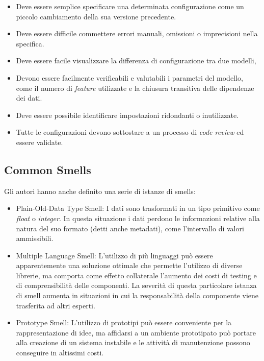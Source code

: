 \begin{itemize}
\item Deve essere semplice specificare una determinata configurazione come un piccolo cambiamento della sua versione precedente.
\item Deve essere difficile commettere errori manuali, omissioni o imprecisioni nella specifica.
\item Deve essere facile visualizzare la differenza di configurazione tra due modelli,
\item Devono essere facilmente verificabili e valutabili i parametri del modello, come il numero di \textit{feature} utilizzate e la chiusura transitiva delle dipendenze dei dati.
\item Deve essere possibile identificare impostazioni ridondanti o inutilizzate.
\item Tutte le configurazioni devono sottostare a un processo di \textit{code review} ed essere validate.
\end{itemize}

\subsection{Common Smells}

Gli autori hanno anche definito una serie di istanze di smells:

\begin{itemize}
    \item Plain-Old-Data Type Smell: I dati sono trasformati in un tipo primitivo come \textit{float} o \textit{integer}. In questa situazione i dati perdono le informazioni relative alla natura del suo formato (detti anche metadati), come l'intervallo di valori ammissibili.
    \item Multiple Language Smell: L'utilizzo di più linguaggi può essere apparentemente una soluzione ottimale che permette l'utilizzo di diverse librerie, ma comporta come effetto collaterale l'aumento dei costi di testing e di comprensibilità delle componenti. La severità di questa particolare istanza di smell aumenta in situazioni in cui la responsabilità della componente viene trasferita ad altri esperti.
    \item Prototype Smell: L'utilizzo di prototipi può essere conveniente per la rappresentazione di idee, ma affidarsi a un ambiente prototipato può portare alla creazione di un sistema instabile e le attività di manutenzione possono conseguire in altissimi costi. 
\end{itemize}